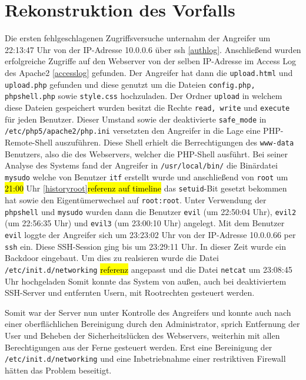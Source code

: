 \section{Rekonstruktion des Vorfalls}
Die ersten fehlgeschlagenen Zugriffsversuche unternahm der Angreifer um 22:13:47 Uhr von der IP-Adresse 10.0.0.6 über ssh \ref{authlog}.
Anschließend wurden erfolgreiche Zugriffe auf den Webserver von der selben IP-Adresse im Access Log des Apache2 \ref{accesslog} gefunden.
Der Angreifer hat dann die \texttt{upload.html} und \texttt{upload.php} gefunden und diese genutzt um die Dateien \texttt{config.php, phpshell.php} sowie \texttt{style.css} hochzuladen. Der Ordner \linebreak \texttt{upload} in welchem diese Dateien gespeichert wurden besitzt die Rechte \texttt{read, write} und \texttt{execute} für jeden Benutzer. 
Dieser Umstand sowie der deaktivierte \texttt{safe\_mode} in \texttt{/etc/php5/apache2/php.ini} versetzten den \linebreak Angreifer in die Lage eine PHP-Remote-Shell auszuführen.
Diese Shell erhielt die Berrechtigungen des \texttt{www-data} Benutzers, also die des Webservers, welcher die PHP-Shell ausführt.
Bei seiner Analyse des Systems fand der Angreifer in \texttt{/usr/local/bin/} die Binärdatei \texttt{mysudo} welche von Benutzer \texttt{itf} erstellt wurde und anschließend von \texttt{root} um \hl{21:00} Uhr \ref{historyroot}\hl{referenz auf timeline} das \texttt{setuid}-Bit gesetzt bekommen hat sowie den Eigentümerwechsel auf \texttt{root:root}.
Unter Verwendung der \texttt{phpshell} und \texttt{mysudo} wurden dann die Benutzer \texttt{evil} (um 22:50:04 Uhr), \texttt{evil2} (um 22:56:35 Uhr) und \texttt{evil3} (um 23:00:10 Uhr) angelegt. Mit dem Benutzer \texttt{evil} loggte der Angreifer sich um 23:23:02 Uhr von der IP-Adresse 10.0.0.66 per \texttt{ssh} ein. Diese SSH-Session ging bis um 23:29:11 Uhr. In dieser Zeit wurde ein Backdoor eingebaut. Um dies zu realsieren wurde die Datei \texttt{/etc/init.d/networking} \hl{referenz} angepasst und die Datei \texttt{netcat} um 23:08:45 Uhr hochgeladen Somit konnte das System von außen, auch bei deaktiviertem SSH-Server und entfernten Usern, mit Rootrechten gesteuert werden.

Somit war der Server nun unter Kontrolle des Angreifers und konnte auch nach einer oberflächlichen Bereinigung durch den Administrator, sprich Entfernung der User und Beheben der Sicherheitslücken des Webservers, weiterhin mit allen Berechtigungen aus der Ferne gesteuert werden. Erst eine Bereinigung der \texttt{/etc/init.d/networking} und eine Inbetriebnahme einer restriktiven Firewall hätten das Problem beseitigt.